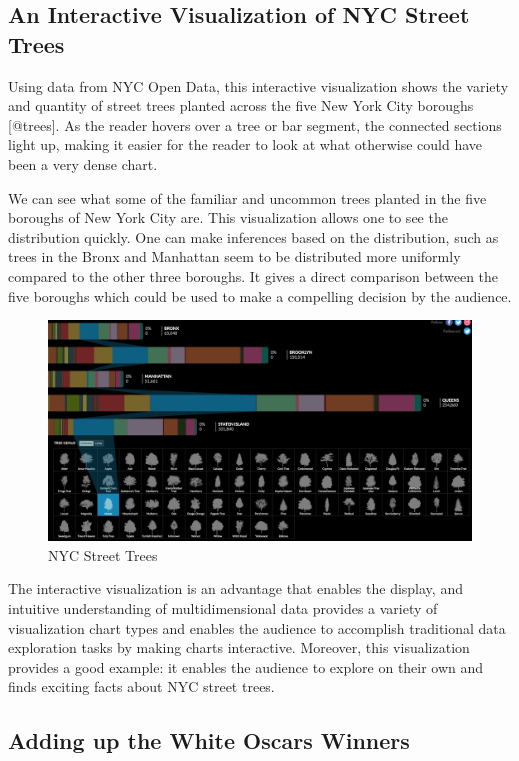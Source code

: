 \documentclass[]{book}
\theoremstyle{definition}
\theoremstyle{definition}
\theoremstyle{definition}
\theoremstyle{remark}
\begin{document}
\subsection{An Interactive Visualization of NYC Street
Trees}\label{an-interactive-visualization-of-nyc-street-trees}

Using data from NYC Open Data, this interactive visualization shows the
variety and quantity of street trees planted across the five New York
City boroughs {[}@trees{]}. As the reader hovers over a tree or bar
segment, the connected sections light up, making it easier for the
reader to look at what otherwise could have been a very dense chart.

We can see what some of the familiar and uncommon trees planted in the
five boroughs of New York City are. This visualization allows one to see
the distribution quickly. One can make inferences based on the
distribution, such as trees in the Bronx and Manhattan seem to be
distributed more uniformly compared to the other three boroughs. It
gives a direct comparison between the five boroughs which could be used
to make a compelling decision by the audience.

\begin{figure}
\centering
\includegraphics{images/NY_trees.png}
\caption{NYC Street Trees}
\end{figure}

The interactive visualization is an advantage that enables the display,
and intuitive understanding of multidimensional data provides a variety
of visualization chart types and enables the audience to accomplish
traditional data exploration tasks by making charts interactive.
Moreover, this visualization provides a good example: it enables the
audience to explore on their own and finds exciting facts about NYC
street trees.

\subsection{Adding up the White Oscars
Winners}\label{adding-up-the-white-oscars-winners}
\end{document}
